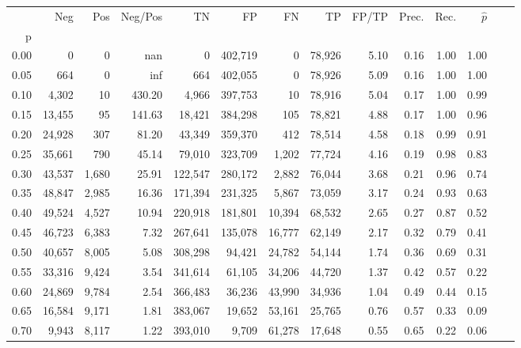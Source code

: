 \begin{tabular}{rrrrrrrrrrrrrr}
\toprule
{} &     Neg &    Pos & Neg/Pos &       TN &       FP &      FN &      TP & FP/TP & Prec. &  Rec. & $\hat{p}$ \\
p    &         &        &         &          &          &         &         &       &       &       &           \\
\midrule
0.00 &       0 &      0 &     nan &        0 &  402,719 &       0 &  78,926 &  5.10 &  0.16 &  1.00 &      1.00 \\
0.05 &     664 &      0 &     inf &      664 &  402,055 &       0 &  78,926 &  5.09 &  0.16 &  1.00 &      1.00 \\
0.10 &   4,302 &     10 &  430.20 &    4,966 &  397,753 &      10 &  78,916 &  5.04 &  0.17 &  1.00 &      0.99 \\
0.15 &  13,455 &     95 &  141.63 &   18,421 &  384,298 &     105 &  78,821 &  4.88 &  0.17 &  1.00 &      0.96 \\
0.20 &  24,928 &    307 &   81.20 &   43,349 &  359,370 &     412 &  78,514 &  4.58 &  0.18 &  0.99 &      0.91 \\
0.25 &  35,661 &    790 &   45.14 &   79,010 &  323,709 &   1,202 &  77,724 &  4.16 &  0.19 &  0.98 &      0.83 \\
0.30 &  43,537 &  1,680 &   25.91 &  122,547 &  280,172 &   2,882 &  76,044 &  3.68 &  0.21 &  0.96 &      0.74 \\
0.35 &  48,847 &  2,985 &   16.36 &  171,394 &  231,325 &   5,867 &  73,059 &  3.17 &  0.24 &  0.93 &      0.63 \\
0.40 &  49,524 &  4,527 &   10.94 &  220,918 &  181,801 &  10,394 &  68,532 &  2.65 &  0.27 &  0.87 &      0.52 \\
0.45 &  46,723 &  6,383 &    7.32 &  267,641 &  135,078 &  16,777 &  62,149 &  2.17 &  0.32 &  0.79 &      0.41 \\
0.50 &  40,657 &  8,005 &    5.08 &  308,298 &   94,421 &  24,782 &  54,144 &  1.74 &  0.36 &  0.69 &      0.31 \\
0.55 &  33,316 &  9,424 &    3.54 &  341,614 &   61,105 &  34,206 &  44,720 &  1.37 &  0.42 &  0.57 &      0.22 \\
0.60 &  24,869 &  9,784 &    2.54 &  366,483 &   36,236 &  43,990 &  34,936 &  1.04 &  0.49 &  0.44 &      0.15 \\
0.65 &  16,584 &  9,171 &    1.81 &  383,067 &   19,652 &  53,161 &  25,765 &  0.76 &  0.57 &  0.33 &      0.09 \\
0.70 &   9,943 &  8,117 &    1.22 &  393,010 &    9,709 &  61,278 &  17,648 &  0.55 &  0.65 &  0.22 &      0.06 \\

\end{tabular}
